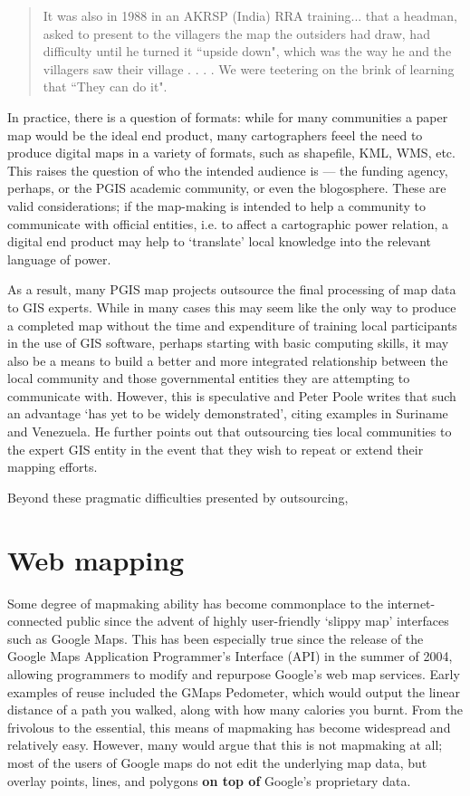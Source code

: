 \documentclass[11pt]{report}
\begin{document}
\begin{quote}
It was also in 1988 in an AKRSP (India) RRA training... that a headman, asked to present to the villagers the map the outsiders had draw, had difficulty until he turned it ``upside down", which was the way he and the villagers saw their village . . . . We were teetering on the brink of learning that ``They can do it".
\cite{chambers2006participatory}
\end{quote}

In practice, there is a question of formats: while for many communities a paper map would be the ideal end product, many cartographers feeel the need to produce digital maps in a variety of formats, such as shapefile, KML, WMS, etc. This raises the question of who the intended audience is --- the funding agency, perhaps, or the PGIS academic community, or even the blogosphere. These are valid considerations; if the map-making is intended to help a community to communicate with official entities, i.e. to affect a cartographic power relation, a digital end product may help to `translate' local knowledge into the relevant language of power. 

As a result, many PGIS map projects outsource the final processing of map data to GIS experts. While in many cases this may seem like the only way to produce a completed map without the time and expenditure of training local participants in the use of GIS software, perhaps starting with basic computing skills, it may also be a means to build a better and more integrated relationship between the local community and those governmental entities they are attempting to communicate with. However, this is speculative and Peter Poole writes that such an advantage `has yet to be widely demonstrated', citing examples in Suriname and Venezuela. He further points out that outsourcing ties local communities to the expert GIS entity in the event that they wish to repeat or extend their mapping efforts. \cite{poole2006there}

Beyond these pragmatic difficulties presented by outsourcing,  

\section{Web mapping}
\label{sec:webmapping}
Some degree of mapmaking ability has become commonplace to the internet-connected public since the advent of highly user-friendly `slippy map' interfaces such as Google Maps. This has been especially true since the release of the Google Maps Application Programmer's Interface (API) in the summer of 2004, allowing programmers to modify and repurpose Google's web map services.  Early examples of reuse included the GMaps Pedometer, which would output the linear distance of a path you walked, along with how many calories you burnt. \cite{gibson2006google} From the frivolous to the essential, this means of mapmaking has become widespread and relatively easy. However, many would argue that this is not mapmaking at all; most of the users of Google maps do not edit the underlying map data, but overlay points, lines, and polygons \textbf{on top of} Google's proprietary data.
\end{document}
